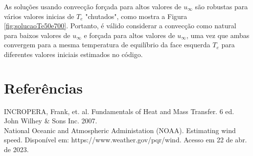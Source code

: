 \documentclass[12pt]{scrartcl}
\begin{document}
As soluções usando convecção forçada para altos valores de $u_{\infty}$ são robustas para vários valores 
inicias de $T_e$ "chutados", como mostra a Figura \ref*{fig:solucaoTe50e700}. Portanto, é válido considerar a convecção como natural para baixos
valores de $u_{\infty}$ e forçada para altos valores de $u_{\infty}$, uma vez que ambas convergem para a mesma 
temperatura de equilíbrio da face esquerda $T_e$ para diferentes valores iniciais estimados no código.

\section{Referências}

INCROPERA, Frank, et. al. Fundamentals of Heat and Mass Transfer. 6 ed. John Wilhey \& Sons Inc. 2007. \\

National Oceanic and Atmospheric Administation (NOAA). Estimating wind speed. Disponível em: https://www.weather.gov/pqr/wind.
Acesso em 22 de abr. de 2023.
\end{document}
